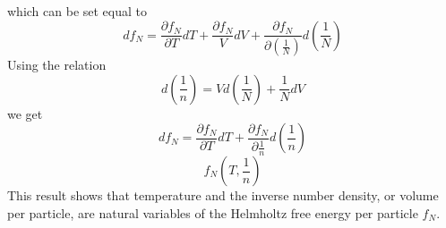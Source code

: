 \documentclass[double,12pt]{beavtex}
\begin{document}
which can be set equal to 
\begin{displaymath}df_N=\frac{\partial f_N}{\partial T}dT +\frac{\partial f_N}{V}dV+ \frac{\partial f_N}{\partial \left(\frac{1}{N}\right)}d\left(\frac{1}{N}\right)\end{displaymath}
Using the relation
\begin{displaymath}d\left(\frac{1}{n}\right)=Vd\left(\frac{1}{N}\right)+\frac{1}{N}dV\end{displaymath}
we get
\begin{displaymath}df_N=\frac{\partial f_N}{\partial T}dT + \frac{\partial f_N}{\partial \frac{1}{n}}d\left(\frac{1}{n}\right)\end{displaymath}
\begin{equation}f_N(T,\frac{1}{n})\end{equation}
This result shows that temperature and the inverse number density, 
or volume per particle, are natural variables of the Helmholtz free energy 
per particle $f_N$.
\end{document}
